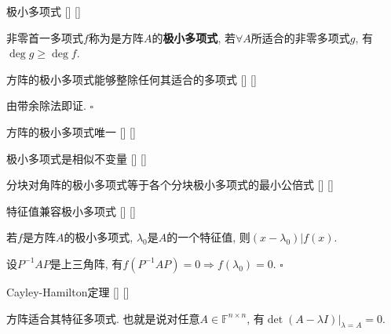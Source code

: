 \documentclass[UTF8]{ctexart}
\begin{document}
		\begin{dfn}
			[]
			{极小多项式}
			[]
			[]

			非零首一多项式$f$称为是方阵$A$的\textbf{极小多项式}, 若$\forall A$所适合的非零多项式$g$, 有$\deg g\geq\deg f$. 
		\end{dfn}
		
		\begin{ppt}
			[]
			{方阵的极小多项式能够整除任何其适合的多项式}
			[]
			[]

		\end{ppt}

		\begin{prf}
			由带余除法即证. $\square$
		\end{prf}

		\begin{ppt}
			[]
			{方阵的极小多项式唯一}
			[]
			[]

		\end{ppt}
		
		\begin{ppt}
			[]
			{极小多项式是相似不变量}
			[]
			[]

		\end{ppt}
		
		\begin{ppt}
			[]
			{分块对角阵的极小多项式等于各个分块极小多项式的最小公倍式}
			[]
			[]

		\end{ppt}
		
		\begin{ppt}
			[]
			{特征值兼容极小多项式}
			[]
			[]

			若$f$是方阵$A$的极小多项式, $\lambda_0$是$A$的一个特征值, 则$(x-\lambda_0)|f(x)$. 
		\end{ppt}

		\begin{prf}
			设$P^{-1}AP$是上三角阵, 有$f(P^{-1}AP)=0\Longrightarrow f(\lambda_0)=0$. $\square$
		\end{prf}
		
		\begin{thm}
			[]
			{Cayley-Hamilton定理}
			[]
			[]

			方阵适合其特征多项式. 也就是说对任意$A\in\mathbb{F}^{n\times n}$, 有$\det(A-\lambda I)|_{\lambda=A}=0$.
		\end{thm}
\end{document}
